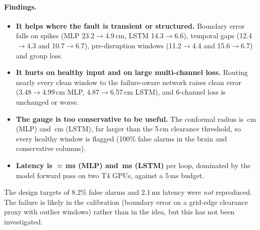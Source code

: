 \documentclass[11pt,a4paper]{article}
\begin{document}
\paragraph{Findings.}
\begin{itemize}
  \item \textbf{It helps where the fault is transient or structured.} Boundary error falls on spikes (MLP 23.2$\to$4.9\,cm, LSTM 14.3$\to$6.6),
        temporal gaps (12.4$\to$4.3 and 10.7$\to$6.7), pre-disruption windows (11.2$\to$4.4 and 15.6$\to$6.7) and group loss.
  \item \textbf{It hurts on healthy input and on large multi-channel loss.} Routing nearly every clean window to the failure-aware
        network raises clean error (3.48$\to$4.99\,cm MLP, 4.87$\to$6.57\,cm LSTM), and 6-channel loss is unchanged or worse.
  \item \textbf{The gauge is too conservative to be useful.} The conformal radius is \DeltaMLP\,cm (MLP) and \DeltaLSTM\,cm (LSTM), far larger than
        the 5\,cm clearance threshold, so every healthy window is flagged (100\% false alarms in the brain and conservative columns).
  \item \textbf{Latency is $\approx$\LatMLP\,ms (MLP) and \LatLSTM\,ms (LSTM)} per loop, dominated by the model forward pass on two
        T4 GPUs, against a 5\,ms budget.
\end{itemize}
The design targets of 8.2\% false alarms and 2.1\,ms latency were \emph{not} reproduced. The failure is likely in the calibration
(boundary error on a grid-edge clearance proxy with outlier windows) rather than in the idea, but this has not been investigated.

\end{document}

